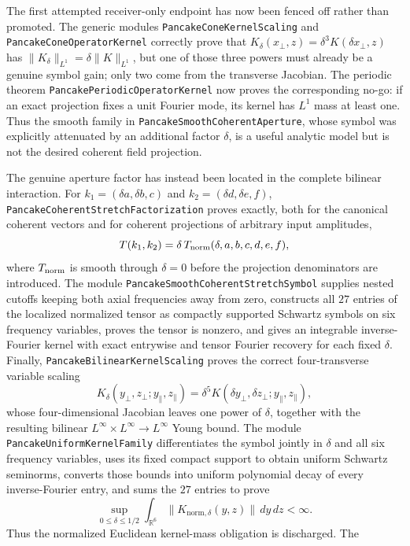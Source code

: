 \documentclass[11pt]{article}
\theoremstyle{definition}
\begin{document}
The first attempted receiver-only endpoint has now been fenced off rather
than promoted.  The generic modules \texttt{PancakeConeKernelScaling} and
\texttt{PancakeConeOperatorKernel} correctly prove that
$K_\delta(x_\perp,z)=\delta^3K(\delta x_\perp,z)$ has
$\|K_\delta\|_{L^1}=\delta\|K\|_{L^1}$, but one of those three powers must
already be a genuine symbol gain; only two come from the transverse
Jacobian.  The periodic theorem
\texttt{PancakePeriodicOperatorKernel} now proves the corresponding no-go:
if an exact projection fixes a unit Fourier mode, its kernel has $L^1$ mass
at least one.  Thus the smooth family in
\texttt{PancakeSmoothCoherentAperture}, whose symbol was explicitly
attenuated by an additional factor $\delta$, is a useful analytic model but
is not the desired coherent field projection.

The genuine aperture factor has instead been located in the complete
bilinear interaction.  For
$k_1=(\delta a,\delta b,c)$ and
$k_2=(\delta d,\delta e,f)$,
\texttt{PancakeCoherentStretchFactorization} proves exactly, both for the
canonical coherent vectors and for coherent projections of arbitrary input
amplitudes,
\[
 T(k_1,k_2)=\delta\,T_{\rm norm}(\delta,a,b,c,d,e,f),
\]
where $T_{\rm norm}$ is smooth through $\delta=0$ before the projection
denominators are introduced.  The module
\texttt{PancakeSmoothCoherentStretchSymbol} supplies nested cutoffs keeping
both axial frequencies away from zero, constructs all $27$ entries of the
localized normalized tensor as compactly supported Schwartz symbols on six
frequency variables, proves the tensor is nonzero, and gives an integrable
inverse-Fourier kernel with exact entrywise and tensor Fourier recovery for
each fixed $\delta$.  Finally,
\texttt{PancakeBilinearKernelScaling} proves the correct four-transverse
variable scaling
\[
 K_\delta(y_\perp,z_\perp;y_\parallel,z_\parallel)
 =\delta^5K(\delta y_\perp,\delta z_\perp;
             y_\parallel,z_\parallel),
\]
whose four-dimensional Jacobian leaves one power of $\delta$, together with
the resulting bilinear $L^\infty\times L^\infty\to L^\infty$ Young bound.
The module \texttt{PancakeUniformKernelFamily} differentiates the symbol
jointly in $\delta$ and all six frequency variables, uses its fixed compact
support to obtain uniform Schwartz seminorms, converts those bounds into
uniform polynomial decay of every inverse-Fourier entry, and sums the $27$
entries to prove
\[
 \sup_{0\leq\delta\leq 1/2}\int_{\mathbb R^6}
   \lVert K_{\mathrm{norm},\delta}(y,z)\rVert\,dy\,dz < \infty.
\]
Thus the normalized Euclidean kernel-mass obligation is discharged.  The
\end{document}
